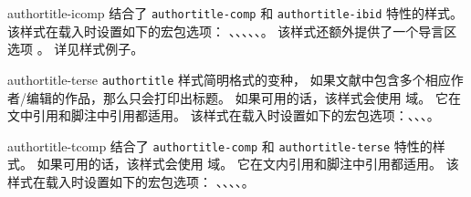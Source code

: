 \begin{marglist}
\item[authortitle-icomp]
结合了 \texttt{authortitle-comp} 和 \texttt{authortitle-ibid} 特性的样式。
该样式在载入时设置如下的宏包选项：
、、、、、。
该样式还额外提供了一个导言区选项 。
详见样式例子。

\item[authortitle-terse]
\texttt{authortitle} 样式简明格式的变种，
如果文献中包含多个相应作者/编辑的作品，那么只会打印出标题。
如果可用的话，该样式会使用  域。
它在文中引用和脚注中引用都适用。
该样式在载入时设置如下的宏包选项：、、、。

\item[authortitle-tcomp]
结合了 \texttt{authortitle-comp} 和 \texttt{authortitle-terse} 特性的样式。
如果可用的话，该样式会使用  域。
它在文内引用和脚注中引用都适用。
该样式在载入时设置如下的宏包选项：
、、、、。


\end{marglist}
